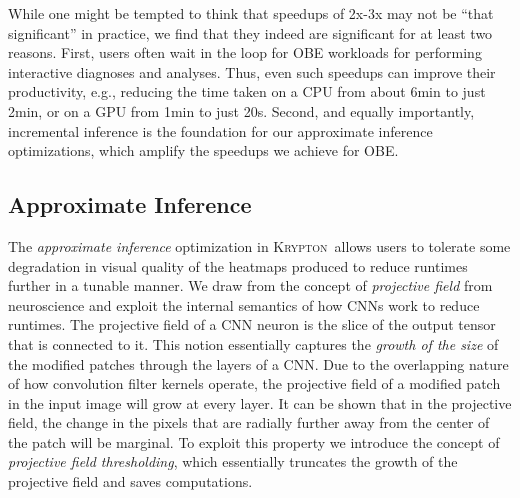 \documentclass{vldb}
\newcommand{\system}{\textsc{Krypton}}
\begin{document}
While one might be tempted to think that speedups of 2x-3x may not be ``that significant'' in practice, we find that they indeed are significant for at least two reasons.
First, users often wait in the loop for OBE workloads for performing interactive diagnoses and analyses.
Thus, even such speedups can improve their productivity, e.g., reducing the time taken on a CPU from about 6min to just 2min, or on a GPU from
1min to just 20s.
Second, and equally importantly, incremental inference is the foundation for our approximate inference optimizations, which amplify the speedups we achieve for OBE.

\subsection{Approximate Inference}
The \textit{approximate inference} optimization in \system~allows users to tolerate some degradation in visual quality of the heatmaps produced to reduce runtimes further in a tunable manner.
We draw from the concept of \textit{projective field} from neuroscience and exploit the internal semantics of how CNNs work to reduce runtimes.
The projective field of a CNN neuron is the slice of the output tensor that is connected to it.
This notion essentially captures the \textit{growth of the size} of the modified patches through the layers of a CNN.
Due to the overlapping nature of how convolution filter kernels operate, the projective field of a modified patch in the input image will grow at every layer.
It can be shown that in the projective field, the change in the pixels that are radially further away from the center of the patch will be marginal.
To exploit this property we introduce the concept of \textit{projective field thresholding}, which essentially truncates the growth of the projective field and saves computations.


\end{document}
